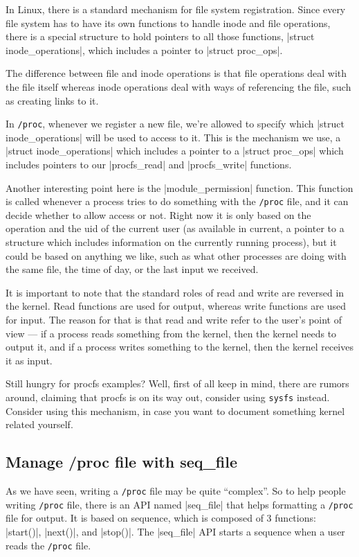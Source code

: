 \documentclass[10pt, oneside]{book}
\begin{document}
In Linux, there is a standard mechanism for file system registration.
Since every file system has to have its own functions to handle inode and file operations, there is a special structure to hold pointers to all those functions, \cpp|struct inode_operations|, which includes a pointer to \cpp|struct proc_ops|.

The difference between file and inode operations is that file operations deal with the file itself whereas inode operations deal with ways of referencing the file, such as creating links to it.

In \verb|/proc|, whenever we register a new file, we're allowed to specify which \cpp|struct inode_operations| will be used to access to it.
This is the mechanism we use, a \cpp|struct inode_operations| which includes a pointer to a \cpp|struct proc_ops| which includes pointers to our \cpp|procfs_read| and \cpp|procfs_write| functions.

Another interesting point here is the \cpp|module_permission| function.
This function is called whenever a process tries to do something with the \verb|/proc| file, and it can decide whether to allow access or not.
Right now it is only based on the operation and the uid of the current user (as available in current, a pointer to a structure which includes information on the currently running process), but it could be based on anything we like, such as what other processes are doing with the same file, the time of day, or the last input we received.

It is important to note that the standard roles of read and write are reversed in the kernel.
Read functions are used for output, whereas write functions are used for input.
The reason for that is that read and write refer to the user's point of view --- if a process reads something from the kernel, then the kernel needs to output it, and if a process writes something to the kernel, then the kernel receives it as input.


Still hungry for procfs examples?
Well, first of all keep in mind, there are rumors around, claiming that procfs is on its way out, consider using \verb|sysfs| instead.
Consider using this mechanism, in case you want to document something kernel related yourself.

\subsection{Manage /proc file with seq\_file}
\label{sec:manage_procfs_with_seq_file}
As we have seen, writing a \verb|/proc| file may be quite ``complex''.
So to help people writing \verb|/proc| file, there is an API named \cpp|seq_file| that helps formatting a \verb|/proc| file for output.
It is based on sequence, which is composed of 3 functions: \cpp|start()|, \cpp|next()|, and \cpp|stop()|.
The \cpp|seq_file| API starts a sequence when a user reads the \verb|/proc| file.
\end{document}
